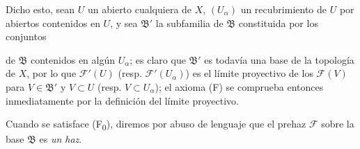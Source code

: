 \begin{env}[3.2.2]
Dicho esto, sean $U$ un abierto cualquiera de $X$, $(U_\alpha)$ un recubrimiento
de $U$ por abiertos contenidos en $U$, y sea $\mathfrak{B}'$ la
subfamilia de $\mathfrak{B}$ constituida por los conjuntos


de $\mathfrak{B}$ contenidos en algún $U_\alpha$; es claro que
$\mathfrak{B}'$ es todavía una base de la topología de $X$, por lo que
$\mathcal{F}'(U)$ (resp. $\mathcal{F}'(U_\alpha)$) es el límite proyectivo de los
$\mathcal{F}(V)$ para $V\in\mathfrak{B}'$ y $V\subset U$ (resp.
$V\subset U_\alpha$); el axioma (F) se comprueba entonces inmediatamente por la
definición del límite proyectivo.

Cuando se satisface (F\textsubscript{0}), diremos por abuso de lenguaje que
el prehaz $\mathcal{F}$ sobre la base $\mathfrak{B}$ es \emph{un haz}.
\end{env}
